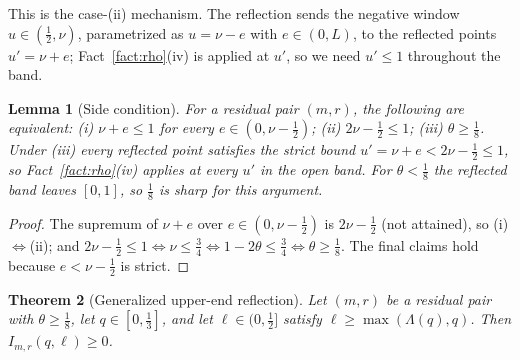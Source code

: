 \documentclass[11pt]{amsart}
\newtheorem{theorem}{Theorem}
\newtheorem{lemma}[theorem]{Lemma}
\theoremstyle{remark}
\begin{document}
This is the case-(ii) mechanism.  The reflection sends the negative window $u\in(\tfrac12,\nu)$, parametrized as $u=\nu-e$ with $e\in(0,L)$, to the reflected points $u'=\nu+e$; Fact~\ref{fact:rho}(iv) is applied at $u'$, so we need $u'\le1$ throughout the band.

\begin{lemma}[Side condition]\label{lem:side}
For a residual pair $(m,r)$, the following are equivalent: \textup{(i)} $\nu+e\le1$ for every $e\in(0,\nu-\tfrac12)$; \textup{(ii)} $2\nu-\tfrac12\le1$; \textup{(iii)} $\theta\ge\tfrac18$.  Under \textup{(iii)} every reflected point satisfies the strict bound $u'=\nu+e<2\nu-\tfrac12\le1$, so Fact~\ref{fact:rho}(iv) applies at every $u'$ in the open band.  For $\theta<\tfrac18$ the reflected band leaves $[0,1]$, so $\tfrac18$ is sharp for this argument.
\end{lemma}

\begin{proof}
The supremum of $\nu+e$ over $e\in(0,\nu-\tfrac12)$ is $2\nu-\tfrac12$ (not attained), so (i)$\Leftrightarrow$(ii); and $2\nu-\tfrac12\le1\iff\nu\le\tfrac34\iff1-2\theta\le\tfrac34\iff\theta\ge\tfrac18$.  The final claims hold because $e<\nu-\tfrac12$ is strict.
\end{proof}

\begin{theorem}[Generalized upper-end reflection]\label{thm:reflection}
Let $(m,r)$ be a residual pair with $\theta\ge\tfrac18$, let $q\in[0,\tfrac13]$, and let $\ell\in(0,\tfrac12]$ satisfy $\ell\ge\max(\Lambda(q),q)$.  Then $I_{m,r}(q,\ell)\ge0$.
\end{theorem}
\end{document}
